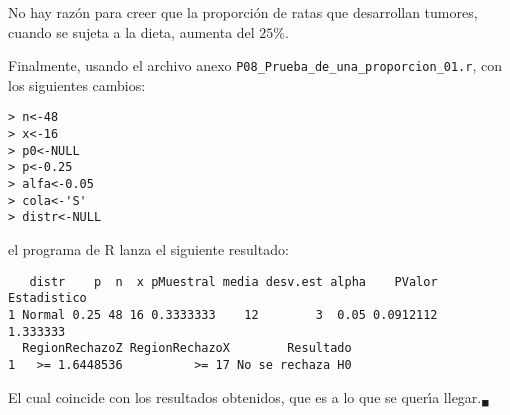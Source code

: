 \begin{solucion}
 \begin{conclusion}
  No hay raz\'on para creer que la proporci\'on de ratas que desarrollan tumores,
  cuando se sujeta a la dieta, aumenta del $25\%$.
 \end{conclusion}
 Finalmente, usando el archivo anexo \texttt{P08\_Prueba\_de\_una\_proporcion\_01.r},
 con los siguientes cambios:
 \begin{verbatim}
> n<-48
> x<-16
> p0<-NULL
> p<-0.25
> alfa<-0.05
> cola<-'S'
> distr<-NULL
 \end{verbatim}
 \vspace{-0.5cm}
 el programa de R lanza el siguiente resultado:
 \begin{verbatim}
   distr    p  n  x pMuestral media desv.est alpha    PValor Estadistico
1 Normal 0.25 48 16 0.3333333    12        3  0.05 0.0912112    1.333333
  RegionRechazoZ RegionRechazoX        Resultado
1   >= 1.6448536          >= 17 No se rechaza H0
 \end{verbatim}
 \vspace{-0.5cm}
 El cual coincide con los resultados obtenidos,
 que es a lo que se quer\'{\i}a llegar.${}_{\blacksquare}$
\end{solucion}
